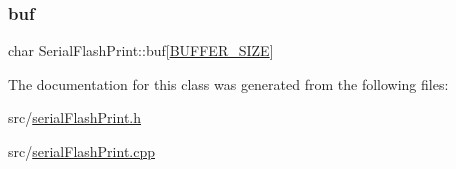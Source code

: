 \mbox{\label{class_serial_flash_print_a876c496ebcda3b4489fdfbc15e475c04}} 
\subsubsection{\texorpdfstring{buf}{buf}}
{\footnotesize\ttfamily char Serial\+Flash\+Print\+::buf\mbox{[}\hyperlink{serial_flash_print_8h_a6b20d41d6252e9871430c242cb1a56e7}{B\+U\+F\+F\+E\+R\+\_\+\+S\+I\+ZE}\mbox{]}\hspace{0.3cm}{\ttfamily [private]}}



The documentation for this class was generated from the following files\+:\begin{DoxyCompactItemize}
\item 
src/\hyperlink{serial_flash_print_8h}{serial\+Flash\+Print.\+h}\item 
src/\hyperlink{serial_flash_print_8cpp}{serial\+Flash\+Print.\+cpp}\end{DoxyCompactItemize}
